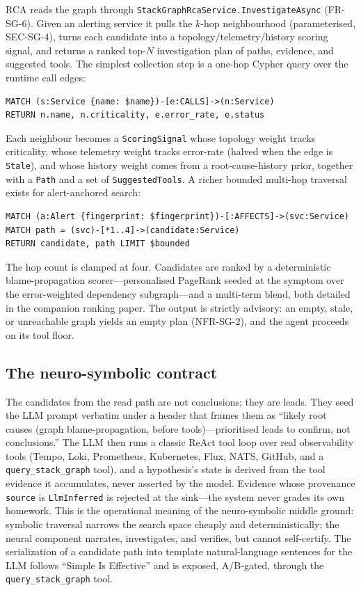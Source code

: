 \documentclass[11pt]{article}
\begin{document}
RCA reads the graph through \texttt{StackGraphRcaService.InvestigateAsync}
(FR-SG-6). Given an alerting service it pulls the $k$-hop neighbourhood
(parameterised, SEC-SG-4), turns each candidate into a topology/telemetry/history
scoring signal, and returns a ranked top-$N$ investigation plan of paths,
evidence, and suggested tools. The simplest collection step is a one-hop Cypher
query over the runtime call edges:

\begin{verbatim}
MATCH (s:Service {name: $name})-[e:CALLS]->(n:Service)
RETURN n.name, n.criticality, e.error_rate, e.status
\end{verbatim}

Each neighbour becomes a \texttt{ScoringSignal} whose topology weight tracks
criticality, whose telemetry weight tracks error-rate (halved when the edge is
\texttt{Stale}), and whose history weight comes from a root-cause-history prior,
together with a \texttt{Path} and a set of \texttt{SuggestedTools}. A richer
bounded multi-hop traversal exists for alert-anchored search:

\begin{verbatim}
MATCH (a:Alert {fingerprint: $fingerprint})-[:AFFECTS]->(svc:Service)
MATCH path = (svc)-[*1..4]->(candidate:Service)
RETURN candidate, path LIMIT $bounded
\end{verbatim}

The hop count is clamped at four. Candidates are ranked by a deterministic
blame-propagation scorer---personalised PageRank seeded at the symptom over the
error-weighted dependency subgraph---and a multi-term blend, both detailed in the
companion ranking paper. The output is strictly advisory: an empty, stale, or
unreachable graph yields an empty plan (NFR-SG-2), and the agent proceeds on its
tool floor.

\subsection{The neuro-symbolic contract}

The candidates from the read path are not conclusions; they are leads. They seed
the LLM prompt verbatim under a header that frames them as ``likely root causes
(graph blame-propagation, before tools)---prioritised leads to confirm, not
conclusions.'' The LLM then runs a classic ReAct tool loop
\citep{yao2022react} over real observability tools (Tempo, Loki, Prometheus,
Kubernetes, Flux, NATS, GitHub, and a \texttt{query\_stack\_graph} tool), and a
hypothesis's state is derived from the tool evidence it accumulates, never
asserted by the model. Evidence whose provenance \texttt{source} is
\texttt{LlmInferred} is rejected at the sink---the system never grades its own
homework. This is the operational meaning of the neuro-symbolic middle ground:
symbolic traversal narrows the search space cheaply and deterministically; the
neural component narrates, investigates, and verifies, but cannot self-certify.
The serialization of a candidate path into template natural-language sentences
for the LLM follows ``Simple Is Effective'' \citep{li2024simple} and is exposed,
A/B-gated, through the \texttt{query\_stack\_graph} tool.
\end{document}
